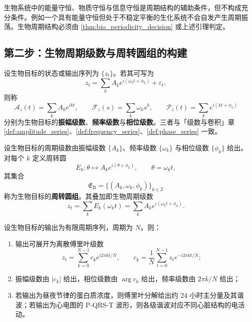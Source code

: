 \begin{remark}[守恒量不保证周期]\label{rem:bio_invariant_not_period}
生物系统中的能量守恒、物质守恒与信息守恒是周期结构的辅助条件，但不构成充分条件。例如一个具有能量守恒但处于不稳定平衡的生化系统不会自发产生周期振荡。生物周期结构必须由 \cref{thm:bio_periodicity_decision} 或上述引理判定。
\end{remark}

\subsection{第二步：生物周期级数与周转圆组的构建}

\begin{definition}\label{def:bio_series}
设生物目标的状态或输出序列为 $\{z_t\}$。若其可写为
\[
z_t=\sum_k A_k e^{i(\omega_k t+\phi_k)}+\varepsilon_t,
\]
则称
\[
\mathcal A_z(t)=\sum_k A_k e^{ikt},\qquad
\mathcal F_z(s)=\sum_k \omega_k s^k,\qquad
\mathcal P_z(t)=\sum_k e^{i(kt+\phi_k)}
\]
分别为生物目标的\textbf{振幅级数}、\textbf{频率级数}与\textbf{相位级数}。三者与「级数与卷积」章 \cref{def:amplitude_series}、\cref{def:frequency_series}、\cref{def:phase_series} 一致。
\end{definition}

\begin{definition}[生物周转圆组]\label{def:bio_epicycle_group}
设生物目标的周期级数由振幅级数 $\{A_k\}$、频率级数 $\{\omega_k\}$ 与相位级数 $\{\phi_k\}$ 给出。对每个 $k$ 定义周转圆
\[
E_k:\theta\mapsto A_k e^{i(\theta+\phi_k)},\qquad \theta=\omega_k t,
\]
其集合
\[
\mathfrak E_{\mathrm{B}}=\{(A_k,\omega_k,\phi_k)\}_{k\in\mathbb Z}
\]
称为生物目标的\textbf{周转圆组}。其叠加即生物周期级数
\[
z_t=\sum_k E_k(\omega_k t)=\sum_k A_k e^{i(\omega_k t+\phi_k)}.
\]
\end{definition}

\begin{theorem}[由生物数据构建周期级数]\label{thm:bio_series_reconstruction}
设生物目标的输出为有限周期序列，周期为 $N$。则：
\begin{enumerate}[label=(\roman*)]
    \item 输出可展开为离散傅里叶级数
    \[
    z_t=\sum_{k=0}^{N-1}c_k e^{i2\pi kt/N},\qquad
    c_k=\frac1N\sum_{t=0}^{N-1}z_t e^{-i2\pi kt/N};
    \]
    \item 振幅级数由 $|c_k|$ 给出，相位级数由 $\arg c_k$ 给出，频率级数由 $2\pi k/N$ 给出；
    \item 若输出为昼夜节律的蛋白质浓度，则傅里叶分解给出约 24 小时主分量及其谐波；若输出为心电图的 P-QRS-T 波形，则各级谐波对应不同心脏结构的电活动。
\end{enumerate}
\end{theorem}

